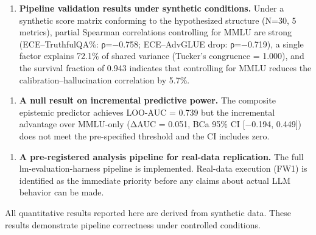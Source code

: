 \begin{enumerate}
\item \textbf{Pipeline validation results under synthetic conditions.} Under a synthetic score matrix conforming to the hypothesized structure (N=30, 5 metrics), partial Spearman correlations controlling for MMLU are strong (ECE–TruthfulQA\%: ρ=−0.758; ECE–AdvGLUE drop: ρ=−0.719), a single factor explains 72.1\% of shared variance (Tucker's congruence = 1.000), and the survival fraction of 0.943 indicates that controlling for MMLU reduces the calibration–hallucination correlation by 5.7\%.
\end{enumerate}

\begin{enumerate}
\item \textbf{A null result on incremental predictive power.} The composite epistemic predictor achieves LOO-AUC = 0.739 but the incremental advantage over MMLU-only (ΔAUC = 0.051, BCa 95\% CI [−0.194, 0.449]) does not meet the pre-specified threshold and the CI includes zero.
\end{enumerate}

\begin{enumerate}
\item \textbf{A pre-registered analysis pipeline for real-data replication.} The full lm-evaluation-harness pipeline is implemented. Real-data execution (FW1) is identified as the immediate priority before any claims about actual LLM behavior can be made.
\end{enumerate}

All quantitative results reported here are derived from synthetic data. These results demonstrate pipeline correctness under controlled conditions.

